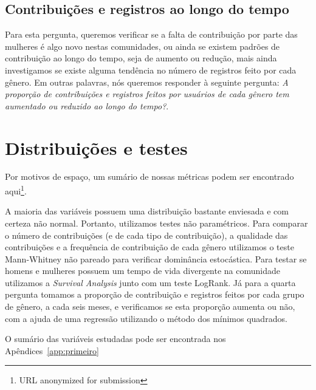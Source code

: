 \subsection{Contribuições e registros ao longo do tempo}

Para esta pergunta, queremos verificar se a falta de contribuição por parte das mulheres é algo novo nestas comunidades, ou ainda se existem padrões de contribuição ao longo do tempo, seja de aumento ou redução, mais ainda investigamos se existe alguma tendência no número de registros feito por cada gênero. Em outras palavras, nós queremos responder à seguinte pergunta: \textit{A proporção de contribuições e registros feitos por usuários de cada gênero tem aumentado ou reduzido ao longo do tempo?}. 

\section{Distribuições e testes}

Por motivos de espaço, um sumário de nossas métricas podem ser encontrado aqui\footnote{URL anonymized for submission}. 

A maioria das variáveis possuem uma distribuição bastante enviesada e com certeza não normal. Portanto, utilizamos testes não paramétricos. Para comparar o número de contribuições (e de cada tipo de contribuição), a qualidade das contribuições e a frequência de contribuição de cada gênero utilizamos o teste Mann-Whitney não pareado para verificar dominância estocástica. Para testar se homens e mulheres possuem um tempo de vida divergente na comunidade utilizamos a \textit{Survival Analysis} junto com um teste  LogRank. Já para a quarta pergunta tomamos a proporção de contribuição e registros feitos por cada grupo de gênero, a cada seis meses, e verificamos se esta proporção aumenta ou não, com a ajuda de uma regressão utilizando o método dos mínimos quadrados.

O sumário das variáveis estudadas pode ser encontrada nos Apêndices~\ref{app:primeiro}


